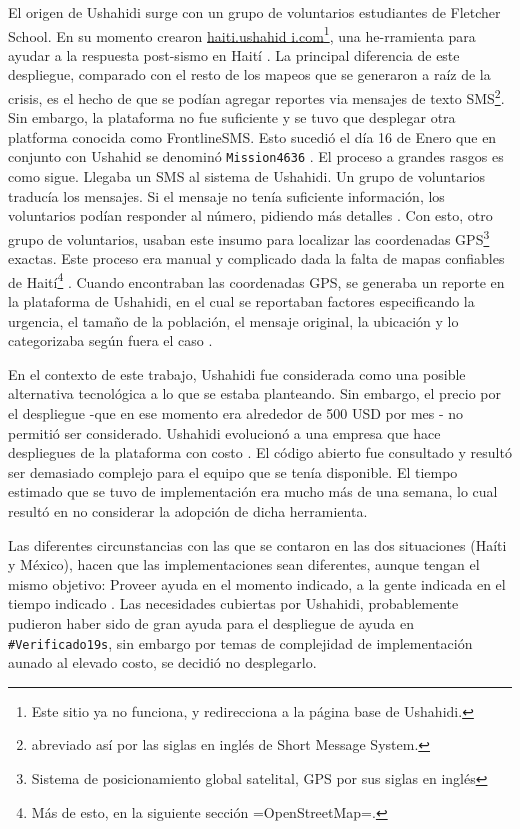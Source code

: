 \documentclass[12pt,spanish,oneside,breaklinks]{book}
\begin{document}
El origen de Ushahidi surge con  un grupo de voluntarios estudiantes de Fletcher School. En su momento crearon \url{haiti.ushahid i.com}\footnote{Este sitio ya no funciona, y redirecciona a la página base de Ushahidi.}, una he-rramienta para ayudar a la respuesta post-sismo en Haití \cite{meier2010}. La principal diferencia de este despliegue, comparado con el resto de los mapeos que se generaron a raíz de la crisis, es el hecho de que se podían agregar reportes via mensajes de texto SMS\footnote{abreviado así por las siglas en inglés de Short Message System.}. Sin embargo, la plataforma no fue suficiente y  se tuvo que desplegar otra platforma conocida como FrontlineSMS. Esto sucedió el día 16 de Enero que en conjunto con Ushahid se denominó  \texttt{Mission4636} \cite{mora2011}. El proceso a grandes rasgos es como sigue. Llegaba un SMS al sistema de Ushahidi. Un grupo de voluntarios traducía los mensajes. Si el mensaje no tenía suficiente información, los voluntarios podían responder al número, pidiendo más detalles \cite{meier2010}. Con esto, otro grupo de voluntarios, usaban este insumo para localizar las coordenadas GPS\footnote{Sistema de posicionamiento global satelital, GPS por sus siglas en inglés} exactas. Este proceso era manual y complicado dada la falta de mapas confiables de Haití\footnote{Más de esto, en la siguiente sección =OpenStreetMap=.} \cite{mora2011}. Cuando encontraban las coordenadas GPS, se generaba un reporte en la plataforma de Ushahidi, en el cual se reportaban factores especificando la urgencia, el tamaño de la población, el mensaje original, la ubicación y lo categorizaba según fuera el caso \cite{meier2010}.

En el contexto de este trabajo, Ushahidi fue considerada como una posible alternativa tecnológica a lo que se estaba planteando. Sin embargo, el precio por el despliegue -que en ese momento era alrededor de 500 USD por mes \cite{previouscost}- no permitió ser considerado.  Ushahidi evolucionó a una empresa que hace despliegues de la plataforma con costo \cite{costushahidi}.  El código abierto fue consultado y resultó ser demasiado complejo para el equipo que se tenía disponible. El tiempo estimado que se tuvo de implementación era mucho más de una semana, lo cual resultó en no considerar la adopción de dicha herramienta. 

Las diferentes circunstancias con las que se contaron en las dos situaciones (Haíti y México), hacen que las implementaciones sean diferentes, aunque tengan el mismo objetivo: Proveer ayuda en el momento indicado, a la gente indicada en el tiempo indicado \cite{Aiko2014}. Las necesidades cubiertas por Ushahidi, probablemente pudieron haber sido de gran ayuda para el despliegue de ayuda en \texttt{\#Verificado19s}, sin embargo por temas de complejidad de implementación aunado al elevado costo, se decidió no desplegarlo.
\end{document}
